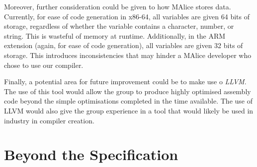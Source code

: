 \documentclass[a4wide, 11pt]{article}
\begin{document}
Moreover, further consideration could be given to how MAlice stores data. 
Currently, for ease of code generation in x86-64, all variables are given
64 bits of storage, regardless of whether the variable contains a character,
number, or string. This is wasteful of memory at runtime. Additionally, in the
ARM extension (again, for ease of code generation), all variables are given
32 bits of storage. This introduces inconsistencies that may hinder a MAlice
developer who chose to use our compiler.

Finally, a potential area for future improvement could be to make use o
\emph{LLVM}. The use of this tool would allow the group to produce highly
optimised assembly code beyond the simple optimisations completed in the time
available. The use of LLVM would also give the group experience in a tool that
would likely be used in industry in compiler creation.

\section{Beyond the Specification}

\enddocument
\end{document}

